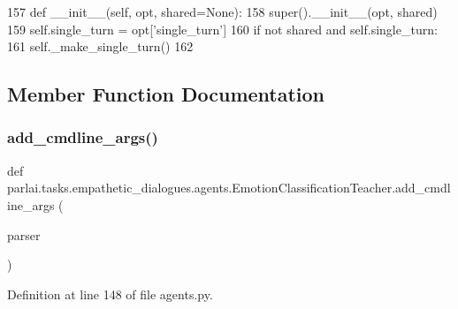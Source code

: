 \begin{DoxyCode}
157     \textcolor{keyword}{def }\_\_init\_\_(self, opt, shared=None):
158         super().\_\_init\_\_(opt, shared)
159         self.single\_turn = opt[\textcolor{stringliteral}{'single\_turn'}]
160         \textcolor{keywordflow}{if} \textcolor{keywordflow}{not} shared \textcolor{keywordflow}{and} self.single\_turn:
161             self.\_make\_single\_turn()
162 
\end{DoxyCode}


\subsection{Member Function Documentation}
\mbox{\label{classparlai_1_1tasks_1_1empathetic__dialogues_1_1agents_1_1EmotionClassificationTeacher_a3989db223e1faf2a956d99d6e0ceaed4}} 
\subsubsection{\texorpdfstring{add\+\_\+cmdline\+\_\+args()}{add\_cmdline\_args()}}
{\footnotesize\ttfamily def parlai.\+tasks.\+empathetic\+\_\+dialogues.\+agents.\+Emotion\+Classification\+Teacher.\+add\+\_\+cmdline\+\_\+args (\begin{DoxyParamCaption}\item[{}]{parser }\end{DoxyParamCaption})\hspace{0.3cm}{\ttfamily [static]}}



Definition at line 148 of file agents.\+py.


